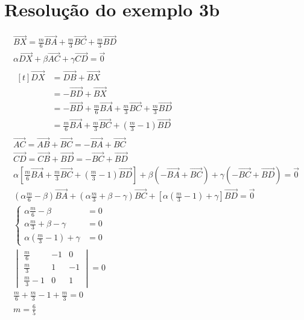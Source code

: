 \documentclass[brazilian, fleqn]{article}
\renewcommand{\vec}[1]{\overrightarrow{#1}}
\begin{document}
\section{Resolução do exemplo 3b}
\begin{gather}
\vec{BX}=\frac{m}{6}\vec{BA}+\frac{m}{3}\vec{BC}+\frac{m}{3}\vec{BD}\\
\alpha \vec{DX}+\beta \vec{AC}+\gamma \vec{CD} = \vec{0} \\
\begin{aligned}[t]
    \vec{DX}&=\vec{DB}+\vec{BX}\\
            &=-\vec{BD}+\vec{BX}\\
            &=-\vec{BD}+\frac{m}{6}\vec{BA}+\frac{m}{3}\vec{BC}+\frac{m}{3}\vec{BD}\\
            &=\frac{m}{6}\vec{BA}+\frac{m}{3}\vec{BC}+\left(\frac{m}{3}-1\right)\vec{BD}
\end{aligned} \\
\vec{AC}=\vec{AB}+\vec{BC}=-\vec{BA}+\vec{BC}\\
\vec{CD}=\vec{CB}+\vec{BD}=-\vec{BC}+\vec{BD}\\
\alpha \left[\frac{m}{6}\vec{BA}+\frac{m}{3}\vec{BC}+\left(\frac{m}{3}-1\right)\vec{BD}\right]+
\beta \left(-\vec{BA}+\vec{BC}\right)+ \gamma \left(-\vec{BC}+\vec{BD}\right) = \vec{0} \\
\left(\alpha\frac{m}{6}-\beta\right)\vec{BA}+\left(\alpha\frac{m}{3}+\beta-\gamma\right)\vec{BC}+
\left[\alpha\left(\frac{m}{3}-1\right)+\gamma\right]\vec{BD}=\vec{0} \\
\begin{cases}
    \alpha\frac{m}{6}-\beta &=0 \\
    \alpha\frac{m}{3}+\beta-\gamma &=0 \\
    \alpha\left(\frac{m}{3}-1\right)+\gamma &=0
\end{cases} \\
\begin{vmatrix}
    \frac{m}{6} & -1 & 0 \\
    \frac{m}{3} & 1 & -1 \\
    \frac{m}{3}-1 & 0 & 1
\end{vmatrix} = 0 \\
\frac{m}{6}+\frac{m}{3}-1+\frac{m}{3}=0 \\
m=\frac{6}{5}
\end{gather}
\end{document}
